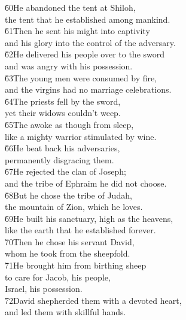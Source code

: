\begin{poetry}
\poeml \v{60}He abandoned the tent at Shiloh, \\
\poemll    the tent that he established among mankind. \\
\poeml \v{61}Then he sent his might into captivity \\
\poemll    and his glory into the control of the adversary. \\
\poeml \v{62}He delivered his people over to the sword \\
\poemll    and was angry with his possession. \\
\poeml \v{63}The young men were consumed by fire, \\
\poemll    and the virgins had no marriage celebrations. \\
\poeml \v{64}The priests fell by the sword, \\
\poemll    yet their widows couldn't weep. \\
\poeml \v{65}The  awoke as though from sleep, \\
\poemll    like a mighty warrior stimulated by wine. \\
\poeml \v{66}He beat back his adversaries, \\
\poemll    permanently disgracing them. \\
\poeml \v{67}He rejected the clan of Joseph; \\
\poemll    and the tribe of Ephraim he did not choose. \\
\poeml \v{68}But he chose the tribe of Judah, \\
\poemll    the mountain of Zion, which he loves. \\
\poeml \v{69}He built his sanctuary, high as the heavens, \\
\poemll    like the earth that he established forever. \\
\poeml \v{70}Then he chose his servant David, \\
\poemll    whom he took from the sheepfold. \\
\poeml \v{71}He brought him from birthing sheep \\
\poemll    to care for Jacob, his people, \\
\poemlll       Israel, his possession. \\
\poeml \v{72}David shepherded them with a devoted heart, \\
\poemll    and led them with skillful hands.
\end{poetry}

